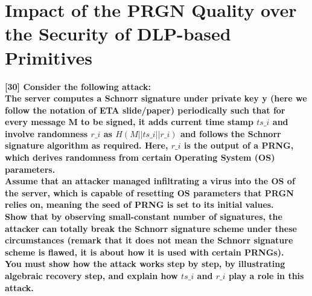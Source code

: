 \documentclass[letterpaper,11pt,notitlepage,fleqn]{article}
\begin{document}
\section{Impact of the PRGN Quality over the Security of DLP-based Primitives}
\noindent \textbf{[30] Consider the following attack:}\\ 
\textbf{The server computes a Schnorr signature under private key y (here we follow the notation of ETA slide/paper) periodically such that for every message M to be signed, it adds current time  stamp  $ts\_i$  and  involve  randomness  $r\_i$  as  $H(M||ts\_i||r\_i)$  and  follows  the  Schnorr signature  algorithm  as  required.  Here,  $r\_i$  is  the  output  of  a  PRNG,  which  derives randomness from certain Operating System (OS) parameters.}  \\
\textbf {Assume  that  an  attacker  managed  infiltrating  a  virus  into  the  OS  of  the  server,  which  is capable of resetting OS parameters that PRGN relies on, meaning the seed of PRNG is set to its initial values.} \\
\textbf{Show that by observing small-constant number of signatures, the attacker can totally break the Schnorr signature scheme under these circumstances (remark that it does not mean the Schnorr signature scheme is flawed, it is about how it is used with certain PRNGs).} \\
\textbf{You must show how the attack works step by step, by illustrating algebraic recovery step, and explain how $ts\_i$ and $r\_i$ play a role in this attack.}
\end{document}

